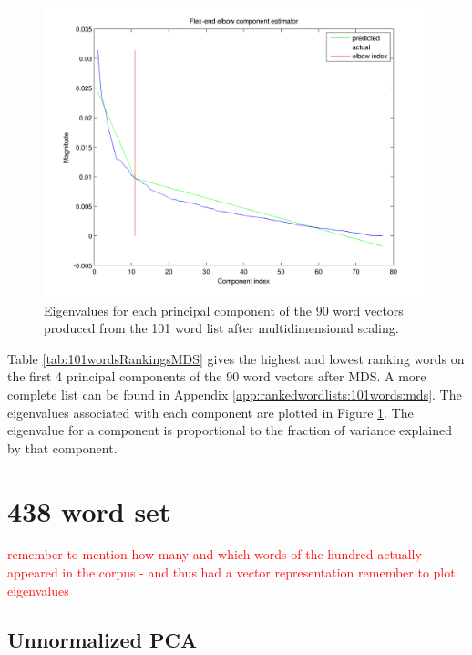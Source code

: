 \documentclass[10pt,letterpaper]{book}
\newcommand{\todo}[1]{\textcolor{red}{#1}}
\begin{document}
\begin{figure}[!htbp]
    \includegraphics[width=0.9\linewidth]{100words-adj-800dim-lowercase_wmt_model-mds_transformed-flex_end_elbow}
    \caption{Eigenvalues for each principal component of the 90 word vectors
    produced from the 101 word list after multidimensional scaling.}
    \label{fig:101wordsmdseigenvalues}
\end{figure}

Table \ref{tab:101wordsRankingsMDS} gives the highest and lowest
ranking words on the first 4 principal components of the 90 word 
vectors after MDS. A more complete list can be found in Appendix 
\ref{app:rankedwordlists:101words:mds}. The eigenvalues associated 
with each component are plotted in Figure 
\ref{fig:101wordsmdseigenvalues}. The eigenvalue for a component is
proportional to the fraction of variance explained by that component.


\section{438 word set}

\todo{remember to mention how many and which words of the hundred actually appeared in the corpus - and thus had a vector representation}
\todo{remember to plot eigenvalues}

\subsection{Unnormalized PCA}


\end{document}
